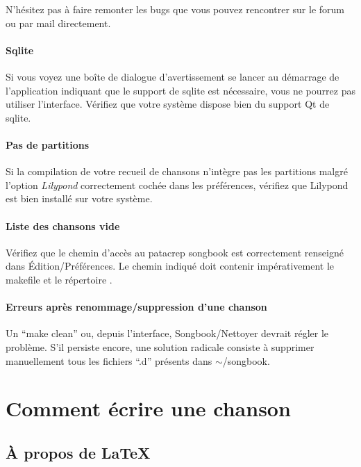 \documentclass[versionenligne]{patacrep}
\begin{document}
N'hésitez pas à faire remonter les bugs que vous pouvez rencontrer sur
le forum ou par mail directement.

\paragraph{Sqlite} 
Si vous voyez une boîte de dialogue d'avertissement se lancer au
démarrage de l'application indiquant que le support de sqlite est
nécessaire, vous ne pourrez pas utiliser l'interface. Vérifiez que
votre système dispose bien du support Qt de sqlite.

\paragraph{Pas de partitions}
Si la compilation de votre recueil de chansons n'intègre pas les
partitions malgré l'option \emph{Lilypond} correctement cochée dans les
préférences, vérifiez que Lilypond est bien installé sur votre système. 

\paragraph{Liste des chansons vide} 
Vérifiez que le chemin d'accès au patacrep songbook est correctement
renseigné dans Édition/Préférences.  Le chemin indiqué doit contenir
impérativement le makefile et le répertoire .

\paragraph{Erreurs après renommage/suppression d'une chanson} 
Un ``make clean'' ou, depuis l'interface, Songbook/Nettoyer devrait
régler le problème. S'il persiste encore, une solution radicale
consiste à supprimer manuellement tous les fichiers ``.d'' présents
dans $\sim$/songbook.


\section{Comment écrire une chanson}

\subsection{À propos de \LaTeX\,}
\end{document}
